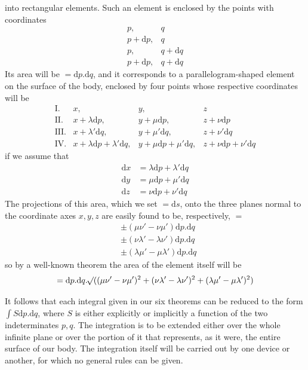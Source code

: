 into rectangular elements. Such an element is enclosed by the points with coordinates
\[
\begin{array}{ll}
p,&q\\
p+\mathrm{d}p,&q\\
p,&q+\mathrm{d}q\\
p+\mathrm{d}p,&q+\mathrm{d}q
\end{array}
\]
Its area will be $=\mathrm{d}p.\mathrm{d}q$, and it corresponds to a parallelogram-shaped element on the surface of the body, enclosed by four points whose respective coordinates will be
\[
\begin{array}{rlll}
\mathrm{I.}&x,&y,&z\\
\mathrm{II.}&x+\lambda\mathrm{d}p,&y+\mu\mathrm{d}p,&z+\nu\mathrm{d}p\\
\mathrm{III.}&x+\lambda'\mathrm{d}q,&y+\mu'\mathrm{d}q,&z+\nu'\mathrm{d}q\\
\mathrm{IV.}&x+\lambda\mathrm{d}p+\lambda'\mathrm{d}q,&y+\mu\mathrm{d}p+\mu'\mathrm{d}q,&z+\nu\mathrm{d}p+\nu'\mathrm{d}q
\end{array}
\]
if we assume that
\[
\begin{aligned}
\mathrm{d}x&=\lambda\mathrm{d}p+\lambda'\mathrm{d}q\\
\mathrm{d}y&=\mu\mathrm{d}p+\mu'\mathrm{d}q\\
\mathrm{d}z&=\nu\mathrm{d}p+\nu'\mathrm{d}q
\end{aligned}
\]
The projections of this area, which we set $=\mathrm{d}s$, onto the three planes normal to the coordinate axes $x,y,z$ are easily found to be, respectively, $=$
\[
\begin{aligned}
&\pm(\mu\nu'-\nu\mu')\mathrm{d}p.\mathrm{d}q\\
&\pm(\nu\lambda'-\lambda\nu')\mathrm{d}p.\mathrm{d}q\\
&\pm(\lambda\mu'-\mu\lambda')\mathrm{d}p.\mathrm{d}q
\end{aligned}
\]
so by a well-known theorem the area of the element itself will be
\[
=\mathrm{d}p.\mathrm{d}q.\mathord{{}^{}\!\surd}((\mu\nu'-\nu\mu')^2+(\nu\lambda'-\lambda\nu')^2+(\lambda\mu'-\mu\lambda')^2)
\]
\par\endgroup
\par
It follows that each integral given in our six theorems can be reduced to the form $\int S\mathrm{d}p.\mathrm{d}q$, where $S$ is either explicitly or implicitly a function of the two indeterminates $p,q$. The integration is to be extended either over the whole infinite plane or over the portion of it that represents, as it were, the entire surface of our body. The integration itself will be carried out by one device or another, for which no general rules can be given.

